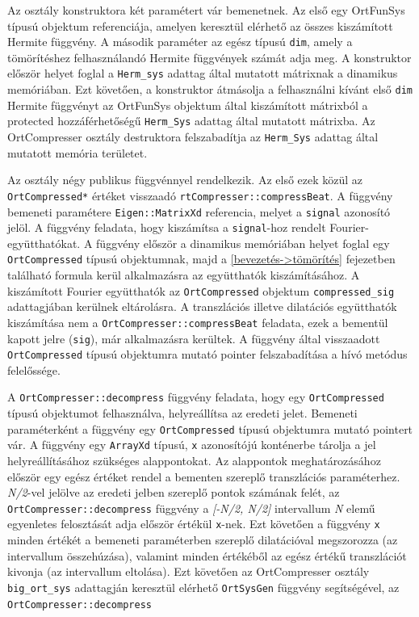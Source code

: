 \documentclass[oneside,titlepage,12pt,a4paper]{report}
\begin{document}
\par Az osztály konstruktora két paramétert vár bemenetnek. Az első egy OrtFunSys típusú objektum referenciája, amelyen keresztül elérhető az összes kiszámított Hermite függvény. A második paraméter az egész típusú \texttt{dim}, amely a tömörítéshez felhasználandó Hermite függvények számát adja meg. A konstruktor először helyet foglal a \texttt{Herm\_sys} adattag által mutatott mátrixnak a dinamikus memóriában. Ezt követően, a konstruktor átmásolja a felhasználni kívánt első \texttt{dim} Hermite függvényt az OrtFunSys objektum által kiszámított mátrixból a protected hozzáférhetőségű \texttt{Herm\_Sys} adattag által mutatott mátrixba. Az OrtCompresser osztály destruktora felszabadítja az \texttt{Herm\_Sys} adattag által mutatott memória területet. 
\par Az osztály négy publikus függvénnyel rendelkezik. Az első ezek közül az \texttt{OrtCompressed*} értéket visszaadó \texttt{rtCompresser::compressBeat}. A függvény bemeneti paramétere \texttt{Eigen::MatrixXd} referencia, melyet a \texttt{signal} azonosító jelöl. A függvény feladata, hogy kiszámítsa a \texttt{signal}-hoz rendelt Fourier-együtthatókat. A függvény először a dinamikus memóriában helyet foglal egy \texttt{OrtCompressed} típusú objektumnak, majd a \ref{bevezetés->tömörítés} fejezetben található formula kerül alkalmazásra az együtthatók kiszámításához. A kiszámított Fourier együtthatók az \texttt{OrtCompressed} objektum \texttt{compressed\_sig} adattagjában kerülnek eltárolásra. A transzlációs illetve dilatációs együtthatók kiszámítása nem a \texttt{OrtCompresser::compressBeat} feladata, ezek a bementül kapott jelre (\texttt{sig}), már alkalmazásra kerültek. A függvény által visszaadott \texttt{OrtCompressed} típusú objektumra mutató pointer felszabadítása a hívó metódus felelőssége. 
\par A \texttt{OrtCompresser::decompress} függvény feladata, hogy egy \texttt{OrtCompressed} típusú objektumot felhasználva, helyreállítsa az eredeti jelet. Bemeneti paraméterként a függvény egy \texttt{OrtCompressed} típusú objektumra mutató pointert vár. A függvény egy \texttt{ArrayXd} típusú, \texttt{x} azonosítójú konténerbe tárolja a jel helyreállításához szükséges alappontokat. Az alappontok meghatározásához először egy egész értéket rendel a bementen szereplő transzlációs paraméterhez. \textit{N/2}-vel jelölve az eredeti jelben szereplő pontok számának felét, az \texttt{OrtCompresser::decompress} függvény a \textit{[-N/2, N/2]} intervallum \textit{N} elemű egyenletes felosztását adja először értékül \texttt{x}-nek. Ezt követően a függvény \texttt{x} minden értékét a bemeneti paraméterben szereplő dilatációval megszorozza (az intervallum összehúzása), valamint minden értékéből az egész értékű transzlációt kivonja (az intervallum eltolása). Ezt követően az OrtCompresser osztály \texttt{big\_ort\_sys} adattagján keresztül elérhető \texttt{OrtSysGen} függvény segítségével, az  \texttt{OrtCompresser::decompress}
\end{document}
